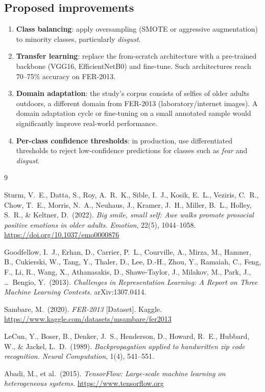 \documentclass[12pt, a4paper]{article}
\begin{document}
\subsection{Proposed improvements}

\begin{enumerate}
  \item \textbf{Class balancing}: apply oversampling (SMOTE or aggressive augmentation) to
        minority classes, particularly \textit{disgust}.
  \item \textbf{Transfer learning}: replace the from-scratch architecture with a pre-trained
        backbone (VGG16, EfficientNetB0) and fine-tune. Such architectures reach 70--75\%
        accuracy on FER-2013.
  \item \textbf{Domain adaptation}: the study's corpus consists of selfies of older adults
        outdoors, a different domain from FER-2013 (laboratory/internet images). A domain
        adaptation cycle or fine-tuning on a small annotated sample would significantly
        improve real-world performance.
  \item \textbf{Per-class confidence thresholds}: in production, use differentiated thresholds
        to reject low-confidence predictions for classes such as \textit{fear} and
        \textit{disgust}.
\end{enumerate}

\begin{thebibliography}{9}

Sturm, V.\ E., Datta, S., Roy, A.\ R.\ K., Sible, I.\ J., Kosik, E.\ L., Veziris, C.\ R.,
Chow, T.\ E., Morris, N.\ A., Neuhaus, J., Kramer, J.\ H., Miller, B.\ L., Holley, S.\ R.,
\& Keltner, D.\ (2022).
\textit{Big smile, small self: Awe walks promote prosocial positive emotions in older adults.}
\textit{Emotion}, 22(5), 1044--1058.
\url{https://doi.org/10.1037/emo0000876}

Goodfellow, I.\ J., Erhan, D., Carrier, P.\ L., Courville, A., Mirza, M., Hamner, B.,
Cukierski, W., Tang, Y., Thaler, D., Lee, D.-H., Zhou, Y., Ramaiah, C., Feng, F., Li, R.,
Wang, X., Athanasakis, D., Shawe-Taylor, J., Milakov, M., Park, J., \ldots\ Bengio, Y.\
(2013).
\textit{Challenges in Representation Learning: A Report on Three Machine Learning Contests.}
arXiv:1307.0414.

Sambare, M.\ (2020).
\textit{FER-2013} [Dataset].
Kaggle.
\url{https://www.kaggle.com/datasets/msambare/fer2013}

LeCun, Y., Boser, B., Denker, J.\ S., Henderson, D., Howard, R.\ E., Hubbard, W.,
\& Jackel, L.\ D.\ (1989).
\textit{Backpropagation applied to handwritten zip code recognition.}
\textit{Neural Computation}, 1(4), 541--551.

Abadi, M., et al.\ (2015).
\textit{TensorFlow: Large-scale machine learning on heterogeneous systems.}
\url{https://www.tensorflow.org}

\end{thebibliography}
\end{document}
